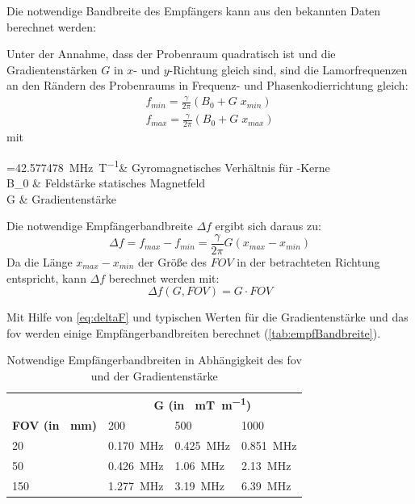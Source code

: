 Die notwendige Bandbreite des Empfängers kann aus den bekannten Daten berechnet werden:

Unter der Annahme, dass der Probenraum quadratisch ist und die Gradientenstärken $G$ in $x$- und $y$-Richtung gleich sind, sind die Lamorfrequenzen an den Rändern des Probenraums in Frequenz- und Phasenkodierrichtung gleich:
\begin{subequations}
	\begin{align}
	f_{min}=\frac{\gamma}{2\pi} (B_0+G\; x_{min}) \\
	f_{max}=\frac{\gamma}{2\pi} (B_0+G\; x_{max})
	\end{align}
\end{subequations}
mit
\begin{with}
	\frac{\gamma}{2\pi} =\SI{42.577478}{\mega\hertz\per\tesla}& Gyromagnetisches Verhältnis für -Kerne \\
	B_0  & Feldstärke statisches Magnetfeld \\
	G  & Gradientenstärke \\
\end{with}

Die notwendige Empfängerbandbreite $\Delta f$ ergibt sich daraus zu:
\begin{equation}
\Delta f = f_{max}-f_{min} = \frac{\gamma}{2\pi} G (x_{max}-x_{min})
\end{equation}
Da die Länge $x_{max}-x_{min}$ der Größe des $FOV$ in der betrachteten Richtung entspricht, kann $\Delta f$ berechnet werden mit:
\begin{equation}
\label{eq:deltaF}
\Delta f(G, FOV) = G \cdot FOV
\end{equation}

Mit Hilfe von \autoref{eq:deltaF} und typischen Werten für die Gradientenstärke und das \gls{fov} werden einige Empfängerbandbreiten berechnet (\autoref{tab:empfBandbreite}).

\begin{table}[H]
	\centering
	\caption[Berechnung Empfängerbandbreite]{Notwendige Empfängerbandbreiten in Abhängigkeit des \gls{fov} und der Gradientenstärke}
	\label{tab:empfBandbreite}
	\begin{tabular}{llll}
		\toprule
		& \multicolumn{3}{c}{\textbf{G (in \SI{}{\milli\tesla\per\meter})}} \\ \cmidrule{2-4}
		\textbf{FOV (in \SI{}{\mm})}& 200 & 500 & 1000 \\
		20 & \SI{0.170}{\mega\hertz} & \SI{0.425}{\mega\hertz} & \SI{0.851}{\mega\hertz} \\
		50 & \SI{0.426}{\mega\hertz} & \SI{1.06}{\mega\hertz} & \SI{2.13}{\mega\hertz} \\
		150 & \SI{1.277}{\mega\hertz} & \SI{3.19}{\mega\hertz} & \SI{6.39}{\mega\hertz} \\
		\bottomrule
	\end{tabular}
\end{table}



